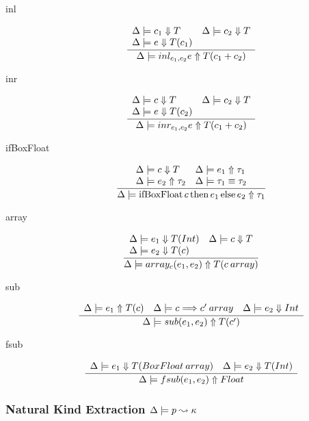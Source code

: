 \documentclass[12pt,twoside,fleqn]{amsart}
\theoremstyle{plain}
\theoremstyle{plain}
\theoremstyle{definition}
\begin{document}
\begin{description}
\item [inl]
\[
\frac{\begin{array}{ll}
\Delta  \models c_{1} \Downarrow T & \Delta  \models c_{2} \Downarrow T\\
\Delta  \models e \Downarrow T(c_{1}) & 
\end{array} }{\Delta  \models inl_{c_{1} ,c_{2} }e  \Uparrow T(c_{1}+c_{2})  }\]

\item [inr]
\[
\frac{\begin{array}{ll}
\Delta  \models c \Downarrow T & \Delta  \models c_{2} \Downarrow T\\
\Delta  \models e \Downarrow T(c_{2}) & 
\end{array} }{\Delta  \models inr_{c_{1} ,c_{2} }e  \Uparrow T(c_{1}+c_{2})  }\]

\item [ifBoxFloat]
\[
\frac{\begin{array}{ll}
\Delta  \models c \Downarrow T & \Delta  \models e_{1}  \Uparrow \tau _{1} \\
\Delta  \models e_{2}  \Uparrow \tau _{2}  & \Delta  \models \tau _{1}  \equiv \tau _{2} 
\end{array} }{\Delta  \models \mathrm{ifBoxFloat}\, c \, \mathrm{then}\, e_{1} \, \mathrm{else}\, e_{2}  \Uparrow \tau _{1}  }\]

\item [array]
\[
\frac{\begin{array}{ll}
\Delta  \models e_{1} \Downarrow T(Int) & \Delta  \models c \Downarrow T\\
\Delta  \models e_{2} \Downarrow T(c) & 
\end{array} }{\Delta  \models array_{c }(e_{1} ,e_{2} )  \Uparrow T(c \: array ) }\]

\item [sub]
\[
\frac{\begin{array}{lll}
\Delta  \models e_{1}  \Uparrow T(c)  & \Delta  \models c \Longrightarrow c' \: array & \Delta  \models e_{2} \Downarrow Int
\end{array} }{\Delta  \models sub(e_{1} ,e_{2} )  \Uparrow T(c')  }\]

\item [fsub]
\[
\frac{\begin{array}{ll}
\Delta  \models e_{1} \Downarrow T(BoxFloat \: array) & \Delta  \models e_{2} \Downarrow T(Int)
\end{array} }{\Delta  \models fsub(e_{1} ,e_{2} )  \Uparrow Float  }\]

\end{description}

\subsubsection{Natural Kind Extraction \protect\( \Delta  \models p  \leadsto \kappa  \protect \)}
\end{document}
